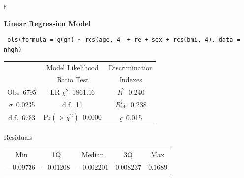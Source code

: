 {\small
\begin{Sinput}
f
\end{Sinput}

 \centerline{\textbf{Linear Regression Model}}
 
 \begin{verbatim}
 ols(formula = g(gh) ~ rcs(age, 4) + re + sex + rcs(bmi, 4), data = nhgh)
 \end{verbatim}
 
 {\selectfont \begin{center}\begin{tabular}{|c|c|c|}\hline
&Model Likelihood&Discrimination\\
&Ratio Test&Indexes\\\hline
Obs~\hfill 6795&LR $\chi^{2}$~\hfill 1861.16&$R^{2}$~\hfill 0.240\\
$\sigma$~\hfill 0.0235&d.f.~\hfill 11&$R^{2}_{\textrm{adj}}$~\hfill 0.238\\
d.f.~\hfill 6783&Pr$(>\chi^{2})$~\hfill 0.0000&$g$~\hfill 0.015\\
\hline
\end{tabular}
\end{center}}
 \begin{center}
 Residuals
 

 \begin{tabular}{ccccc}
Min&1Q&Median&3Q&Max\\
$-0.09736$&$-0.01208$&$-0.002201$&$0.008237$&$0.1689$\\
\end{tabular}
 \end{center}
 
}
